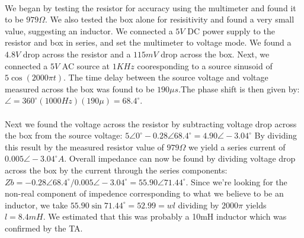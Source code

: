 \documentclass{article}
\begin{document}
\paragraph{}
We began by testing the resistor for accuracy using the multimeter and found
it to be $979\Omega{}$. We also tested the box alone for resisitivity and found
a very small value, suggesting an inductor. We connected a $5V$ DC power supply
to the resistor and box in series, and set the multimeter to voltage mode. We
found a $4.8V$ drop across the resistor and a $115mV$ drop across the box. Next,
we connected a $5V$ AC source at $1KHz$ cooresponding to a source sinusoid of
$5\cos{}(2000\pi{} t)$. The time delay between the source voltage and voltage 
measured across the box was found to be $190\mu{} s$.The phase shift is then 
given by: $\angle{} = 360^\circ{}(1000Hz)(190\mu{}) = 68.4^\circ{}$. 

\paragraph{} 
Next we found the voltage across the resistor by subtracting voltage drop across
the box from the source voltage:
$5\angle{}0^\circ{} - 0.28\angle{}68.4^\circ{} = 4.90\angle{}-3.04^\circ{}$ By
dividing this result by the measured resistor value of $979\Omega$ we yield a 
series current of $0.005\angle{}-3.04^\circ{}A$. Overall impedance can now be 
found by dividing voltage drop across the box by the current through the series
components: 
$Zb= -0.28\angle{}68.4^\circ{} / 0.005\angle{}-3.04^\circ{} = 55.90\angle{}71.44^\circ{}$.
Since we're looking for the non-real component of impedence corresponding to what 
we believe to be an inductor, we take $55.90\sin{}71.44^\circ{} = 52.99 = wl$ 
dividing by $2000\pi{}$ yields $l=8.4mH$. We estimated that this was probably
a 10mH inductor which was confirmed by the TA.   
\end{document}
